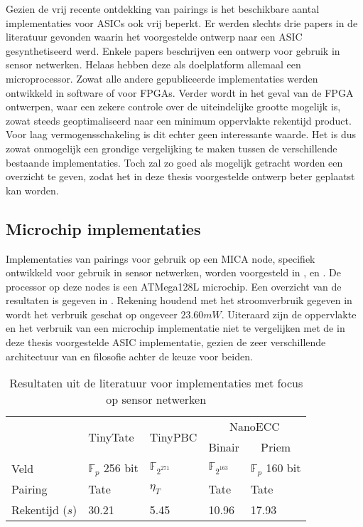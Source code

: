 Gezien de vrij recente ontdekking van pairings is het beschikbare aantal implementaties voor ASICs ook vrij beperkt. Er werden slechts drie papers in de literatuur gevonden waarin het voorgestelde ontwerp naar een ASIC gesynthetiseerd werd. Enkele papers beschrijven een ontwerp voor gebruik in sensor netwerken. Helaas hebben deze als doelplatform allemaal een microprocessor. Zowat alle andere gepubliceerde implementaties werden ontwikkeld in software of voor FPGAs. Verder wordt in het geval van de FPGA ontwerpen, waar een zekere controle over de uiteindelijke grootte mogelijk is, zowat steeds geoptimaliseerd naar een minimum oppervlakte rekentijd product. Voor laag vermogensschakeling is dit echter geen interessante waarde. Het is dus zowat onmogelijk een grondige vergelijking te maken tussen de verschillende bestaande implementaties. Toch zal zo goed als mogelijk getracht worden een overzicht te geven, zodat het in deze thesis voorgestelde ontwerp beter geplaatst kan worden.

\subsection{Microchip implementaties}

Implementaties van pairings voor gebruik op een MICA node, specifiek ontwikkeld voor gebruik in sensor netwerken, worden voorgesteld in \cite{tinytate}, \cite{tinypbc} en \cite{nanoecc}. De processor op deze nodes is een ATMega128L microchip. Een overzicht van de resultaten is gegeven in . Rekening houdend met het stroomverbruik gegeven in \cite{nanoecc} wordt het verbruik geschat op ongeveer $23.60mW$. Uiteraard zijn de oppervlakte en het verbruik van een microchip implementatie niet te vergelijken met de in deze thesis voorgestelde ASIC implementatie, gezien de zeer verschillende architectuur van en filosofie achter de keuze voor beiden.

\begin{table}[h]
	\caption{Resultaten uit de literatuur voor implementaties met focus op sensor netwerken}
	\label{tabel-resultaten-sensor}

	\centering
	\begin{tabular}{lllll}
		\toprule
		& \multirow{2}{*}{TinyTate \cite{tinytate}}	& \multirow{2}{*}{TinyPBC \cite{tinypbc}} &	\multicolumn{2}{c}{NanoECC \cite{nanoecc}}\\
		\cmidrule{4-5}
		& & & \multicolumn{1}{c}{Binair} & \multicolumn{1}{c}{Priem}\\
			\midrule
		Veld					& $\mathbb{F}_{p}$ 256 bit	& $\mathbb{F}_{2^{271}}$	& $\mathbb{F}_{2^{163}}$	& $\mathbb{F}_{p}$ 160 bit\\
		Pairing				& Tate							& $\eta_T$ 						& Tate							& Tate\\
		Rekentijd ($s$)	& 30.21							& 5.45							& 10.96							& 17.93\\
		\bottomrule
	\end{tabular}
\end{table}

